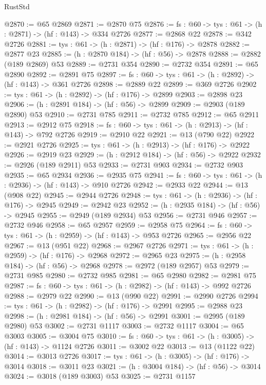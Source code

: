 \begin{lexlean}{RustStd}
\begin{coremodule}
{\begin{coremodule}
{{{{{{{{{{{{@2870 := @65 @2869
@2871 := @2870 @75
@2876 := {fs : @60} -> {tys : @61} -> (h : @2871) -> (hf : @143) -> @334 @2726
@2877 := @2868 @22
@2878 := @342 @2726
@2881 := {tys : @61} -> (h : @2871) -> (hf : @176) -> @2878
@2882 := @2877 @23
@2885 := (h : @2870 @184) -> (hf : @56) -> @2878
@2888 := @2882 (@189 @2869) @53
@2889 := @2731 @354
@2890 := @2732 @354
@2891 := @65 @2890
@2892 := @2891 @75
@2897 := {fs : @60} -> {tys : @61} -> (h : @2892) -> (hf : @143) -> @361 @2726
@2898 := @2889 @22
@2899 := @369 @2726
@2902 := {tys : @61} -> (h : @2892) -> (hf : @176) -> @2899
@2903 := @2898 @23
@2906 := (h : @2891 @184) -> (hf : @56) -> @2899
@2909 := @2903 (@189 @2890) @53
@2910 := @2731 @785
@2911 := @2732 @785
@2912 := @65 @2911
@2913 := @2912 @75
@2918 := {fs : @60} -> {tys : @61} -> (h : @2913) -> (hf : @143) -> @792 @2726
@2919 := @2910 @22
@2921 := @13 (@790 @22)
@2922 := @2921 @2726
@2925 := {tys : @61} -> (h : @2913) -> (hf : @176) -> @2922
@2926 := @2919 @23
@2929 := (h : @2912 @184) -> (hf : @56) -> @2922
@2932 := @2926 (@189 @2911) @53
@2933 := @2731 @903
@2934 := @2732 @903
@2935 := @65 @2934
@2936 := @2935 @75
@2941 := {fs : @60} -> {tys : @61} -> (h : @2936) -> (hf : @143) -> @910 @2726
@2942 := @2933 @22
@2944 := @13 (@908 @22)
@2945 := @2944 @2726
@2948 := {tys : @61} -> (h : @2936) -> (hf : @176) -> @2945
@2949 := @2942 @23
@2952 := (h : @2935 @184) -> (hf : @56) -> @2945
@2955 := @2949 (@189 @2934) @53
@2956 := @2731 @946
@2957 := @2732 @946
@2958 := @65 @2957
@2959 := @2958 @75
@2964 := {fs : @60} -> {tys : @61} -> (h : @2959) -> (hf : @143) -> @953 @2726
@2965 := @2956 @22
@2967 := @13 (@951 @22)
@2968 := @2967 @2726
@2971 := {tys : @61} -> (h : @2959) -> (hf : @176) -> @2968
@2972 := @2965 @23
@2975 := (h : @2958 @184) -> (hf : @56) -> @2968
@2978 := @2972 (@189 @2957) @53
@2979 := @2731 @985
@2980 := @2732 @985
@2981 := @65 @2980
@2982 := @2981 @75
@2987 := {fs : @60} -> {tys : @61} -> (h : @2982) -> (hf : @143) -> @992 @2726
@2988 := @2979 @22
@2990 := @13 (@990 @22)
@2991 := @2990 @2726
@2994 := {tys : @61} -> (h : @2982) -> (hf : @176) -> @2991
@2995 := @2988 @23
@2998 := (h : @2981 @184) -> (hf : @56) -> @2991
@3001 := @2995 (@189 @2980) @53
@3002 := @2731 @1117
@3003 := @2732 @1117
@3004 := @65 @3003
@3005 := @3004 @75
@3010 := {fs : @60} -> {tys : @61} -> (h : @3005) -> (hf : @143) -> @1124 @2726
@3011 := @3002 @22
@3013 := @13 (@1122 @22)
@3014 := @3013 @2726
@3017 := {tys : @61} -> (h : @3005) -> (hf : @176) -> @3014
@3018 := @3011 @23
@3021 := (h : @3004 @184) -> (hf : @56) -> @3014
@3024 := @3018 (@189 @3003) @53
@3025 := @2731 @1157
}}}}}}}}}}}}
\end{coremodule}}
\end{coremodule}
\end{lexlean}
